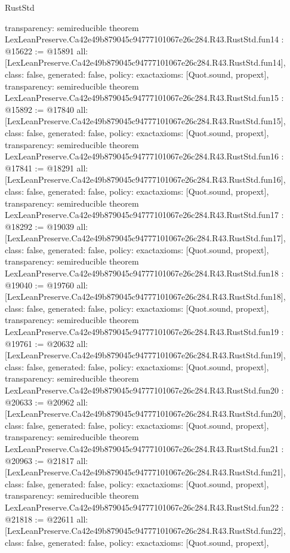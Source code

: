 \begin{lexlean}{RustStd}
\begin{coremodule}
{  transparency: semireducible
}
theorem LexLeanPreserve.Ca42e49b879045c94777101067e26c284.R43.RustStd.fun14 : @15622 := @15891 {
  all: [LexLeanPreserve.Ca42e49b879045c94777101067e26c284.R43.RustStd.fun14],
  class: false,
  generated: false,
  policy: exact{axioms: [Quot.sound, propext]},
  transparency: semireducible
}
theorem LexLeanPreserve.Ca42e49b879045c94777101067e26c284.R43.RustStd.fun15 : @15892 := @17840 {
  all: [LexLeanPreserve.Ca42e49b879045c94777101067e26c284.R43.RustStd.fun15],
  class: false,
  generated: false,
  policy: exact{axioms: [Quot.sound, propext]},
  transparency: semireducible
}
theorem LexLeanPreserve.Ca42e49b879045c94777101067e26c284.R43.RustStd.fun16 : @17841 := @18291 {
  all: [LexLeanPreserve.Ca42e49b879045c94777101067e26c284.R43.RustStd.fun16],
  class: false,
  generated: false,
  policy: exact{axioms: [Quot.sound, propext]},
  transparency: semireducible
}
theorem LexLeanPreserve.Ca42e49b879045c94777101067e26c284.R43.RustStd.fun17 : @18292 := @19039 {
  all: [LexLeanPreserve.Ca42e49b879045c94777101067e26c284.R43.RustStd.fun17],
  class: false,
  generated: false,
  policy: exact{axioms: [Quot.sound, propext]},
  transparency: semireducible
}
theorem LexLeanPreserve.Ca42e49b879045c94777101067e26c284.R43.RustStd.fun18 : @19040 := @19760 {
  all: [LexLeanPreserve.Ca42e49b879045c94777101067e26c284.R43.RustStd.fun18],
  class: false,
  generated: false,
  policy: exact{axioms: [Quot.sound, propext]},
  transparency: semireducible
}
theorem LexLeanPreserve.Ca42e49b879045c94777101067e26c284.R43.RustStd.fun19 : @19761 := @20632 {
  all: [LexLeanPreserve.Ca42e49b879045c94777101067e26c284.R43.RustStd.fun19],
  class: false,
  generated: false,
  policy: exact{axioms: [Quot.sound, propext]},
  transparency: semireducible
}
theorem LexLeanPreserve.Ca42e49b879045c94777101067e26c284.R43.RustStd.fun20 : @20633 := @20962 {
  all: [LexLeanPreserve.Ca42e49b879045c94777101067e26c284.R43.RustStd.fun20],
  class: false,
  generated: false,
  policy: exact{axioms: [Quot.sound, propext]},
  transparency: semireducible
}
theorem LexLeanPreserve.Ca42e49b879045c94777101067e26c284.R43.RustStd.fun21 : @20963 := @21817 {
  all: [LexLeanPreserve.Ca42e49b879045c94777101067e26c284.R43.RustStd.fun21],
  class: false,
  generated: false,
  policy: exact{axioms: [Quot.sound, propext]},
  transparency: semireducible
}
theorem LexLeanPreserve.Ca42e49b879045c94777101067e26c284.R43.RustStd.fun22 : @21818 := @22611 {
  all: [LexLeanPreserve.Ca42e49b879045c94777101067e26c284.R43.RustStd.fun22],
  class: false,
  generated: false,
  policy: exact{axioms: [Quot.sound, propext]},
}
\end{coremodule}
\end{lexlean}
